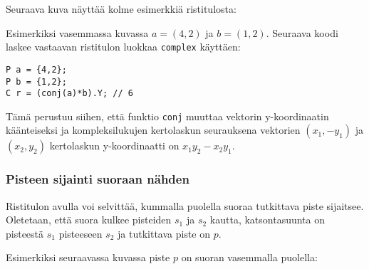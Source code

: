 Seuraava kuva näyttää kolme esimerkkiä ristitulosta:
\begin{center}
\end{center}

\noindent
Esimerkiksi vasemmassa kuvassa
$a=(4,2)$ ja $b=(1,2)$.
Seuraava koodi laskee vastaavan ristitulon
luokkaa \texttt{complex} käyttäen:

\begin{lstlisting}
P a = {4,2};
P b = {1,2};
C r = (conj(a)*b).Y; // 6
\end{lstlisting}

Tämä perustuu siihen, että funktio \texttt{conj}
muuttaa vektorin y-koordinaatin käänteiseksi
ja kompleksilukujen kertolaskun seurauksena
vektorien $(x_1,-y_1)$ ja $(x_2,y_2)$
kertolaskun y-koordinaatti on $x_1 y_2 - x_2 y_1$.

\subsubsection{Pisteen sijainti suoraan nähden}

Ristitulon avulla voi selvittää,
kummalla puolella suoraa tutkittava piste sijaitsee.
Oletetaan, että suora kulkee pisteiden
$s_1$ ja $s_2$ kautta, katsontasuunta on
pisteestä $s_1$ pisteeseen $s_2$ ja
tutkittava piste on $p$.

Esimerkiksi seuraavassa kuvassa piste $p$
on suoran vasemmalla puolella:
\begin{center}
\end{center}

